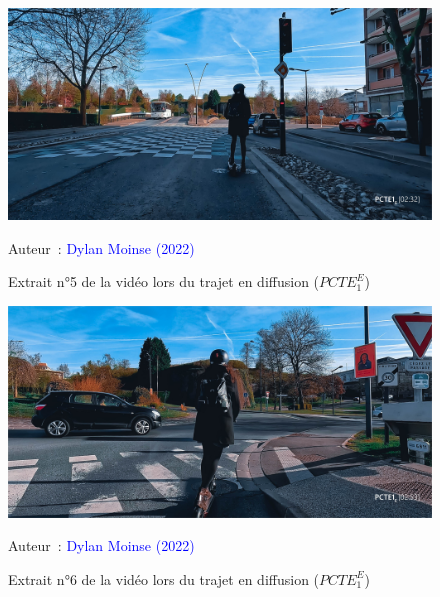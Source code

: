     \begin{figure}[h!]\vspace*{4pt}
        \caption*{Extrait n°5 de la vidéo lors du trajet en diffusion (\(PCTE^{E}_{1}\))}
        \centerline{\includegraphics[width=0.75\columnwidth]{src/Figures/Annexes/Extrait_Video_PCTE1_Egress_5.jpg}}
        \vspace{5pt}
        \begin{flushright}\scriptsize{
        Auteur~: \textcolor{blue}{Dylan Moinse (2022)}
        }\end{flushright}
    \end{figure}

    \begin{figure}[h!]\vspace*{4pt}
        \caption*{Extrait n°6 de la vidéo lors du trajet en diffusion (\(PCTE^{E}_{1}\))}
        \centerline{\includegraphics[width=0.75\columnwidth]{src/Figures/Annexes/Extrait_Video_PCTE1_Egress_6.jpg}}
        \vspace{5pt}
        \begin{flushright}\scriptsize{
        Auteur~: \textcolor{blue}{Dylan Moinse (2022)}
        }\end{flushright}
    \end{figure}

